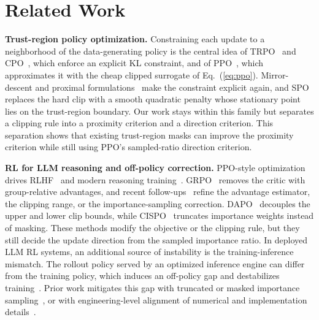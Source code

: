 \section{Related Work}
\label{sec:related}

\noindent\textbf{Trust-region policy optimization.}
Constraining each update to a neighborhood of the data-generating policy is the
central idea of TRPO~\citep{trpo} and CPO~\citep{cpo}, which enforce an explicit
KL constraint, and of PPO~\citep{ppo}, which approximates it with the cheap
clipped surrogate of Eq.~(\ref{eq:ppo}). Mirror-descent and proximal
formulations~\citep{tomar2022mirror,wang2020truly,wang2019trust} make the
constraint explicit again, and SPO~\citep{spo} replaces the hard clip with a
smooth quadratic penalty whose stationary point lies on the trust-region
boundary. Our work stays within this family but separates a clipping rule into a
proximity criterion and a direction criterion. This separation shows that
existing trust-region masks can improve the proximity criterion while still using
PPO's sampled-ratio direction criterion.

\noindent\textbf{RL for LLM reasoning and off-policy correction.}
PPO-style optimization drives RLHF~\citep{ouyang2022training} and modern reasoning
training~\citep{guo2025deepseekr1,team2025kimi,zhou2025reinforcing,zhou2025variational}. GRPO~\citep{grpo} removes the
critic with group-relative advantages, and recent
follow-ups~\citep{ahmadian2024back,drgrpo,yu2025dapo,cispo} refine the advantage
estimator, the clipping range, or the importance-sampling correction.
DAPO~\citep{yu2025dapo} decouples the upper and lower clip bounds, while
CISPO~\citep{cispo} truncates importance weights instead of masking. These
methods modify the objective or the clipping rule, but they still decide the
update direction from the sampled importance ratio.
In deployed LLM RL systems, an additional source of instability is the
training-inference mismatch. The rollout policy served by an optimized inference
engine can differ from the training policy, which induces an off-policy gap and destabilizes
training~\citep{qi2025defeating,yao2025offpolicy,zheng2025stabilizing}.
Prior work mitigates this gap with truncated or masked importance
sampling~\citep{yao2025offpolicy,zheng2025stabilizing,liu-li-2025,team2025every},
or with engineering-level alignment of numerical and implementation
details~\citep{Team2025EveryAM,he2025nondeterminism}.

